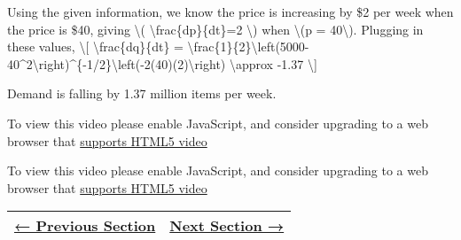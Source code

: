 Using the given information, we know the price is increasing by \$2 per
week when the price is \$40, giving \textbackslash{}(
\textbackslash{}frac\{dp\}\{dt\}=2 \textbackslash{}) when
\textbackslash{}(p = 40\textbackslash{}). Plugging in these values,
\textbackslash{}{[} \textbackslash{}frac\{dq\}\{dt\} =
\textbackslash{}frac\{1\}\{2\}\textbackslash{}left(5000-40\^{}2\textbackslash{}right)\^{}\{-1/2\}\textbackslash{}left(-2(40)(2)\textbackslash{}right)
\textbackslash{}approx -1.37 \textbackslash{}{]}

Demand is falling by 1.37 million items per week.

To view this video please enable JavaScript, and consider upgrading to a
web browser that \href{http://videojs.com/html5-video-support/}{supports
HTML5 video}

To view this video please enable JavaScript, and consider upgrading to a
web browser that \href{http://videojs.com/html5-video-support/}{supports
HTML5 video}

\begin{longtable}[]{@{}ll@{}}
\toprule
\endhead
\href{section2-10.php}{← Previous Section} &
\href{../chapter3/section3-1.php}{Next Section →}\tabularnewline
\bottomrule
\end{longtable}
